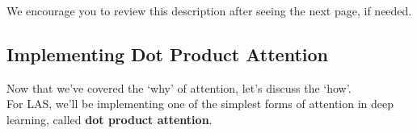 \documentclass{article}
\newcommand{\ttt}[1]{\texttt{#1}}
\begin{document}
We encourage you to review this description after seeing the next page, if needed.







\newpage

\subsection{Implementing Dot Product Attention}

Now that we've covered the `why' of attention, let's discuss the `how'. \\

For LAS, we'll be implementing one of the simplest forms of attention in deep learning, called \textbf{dot product attention}.  \\
\end{document}
